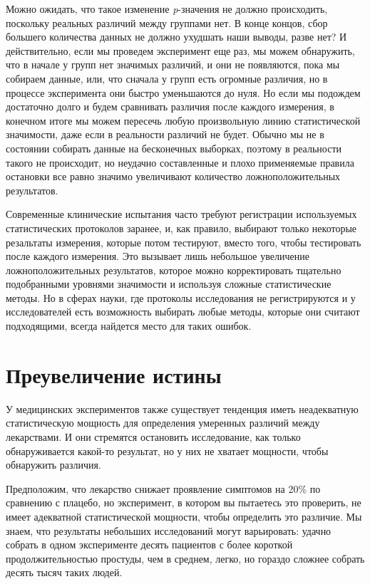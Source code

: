 Можно ожидать, что такое изменение \emph{p}-значения не должно происходить, поскольку реальных различий между группами нет. В конце концов, сбор большего количества данных не должно ухудшать наши выводы, разве нет? И действительно, если мы проведем эксперимент еще раз, мы можем обнаружить, что в начале у групп нет значимых различий, и они не появляются, пока мы собираем данные, или, что сначала у групп есть огромные различия, но в процессе эксперимента они быстро уменьшаются до нуля. Но если мы подождем достаточно долго и будем сравнивать различия после каждого измерения, в конечном итоге мы можем пересечь любую произвольную линию статистической значимости, даже если в реальности различий не будет. Обычно мы не в состоянии собирать данные на бесконечных выборках, поэтому в реальности такого не происходит, но неудачно  составленные и плохо применяемые правила остановки все равно значимо увеличивают количество ложноположительных результатов.\cite{simmons_false-positive_2011}  


Современные клинические испытания часто требуют регистрации используемых статистических протоколов заранее, и, как правило, выбирают только некоторые резальтаты измерения, которые потом тестируют, вместо того, чтобы тестировать после каждого измерения. Это вызывает лишь небольшое увеличение ложноположительных результатов, которое можно корректировать тщательно подобранными уровнями значимости и используя сложные статистические методы.\cite{todd_interim_2001} Но в сферах науки, где протоколы исследования не регистрируются и у исследователей есть возможность выбирать любые методы, которые они считают подходящими, всегда найдется место для таких ошибок.


\section{Преувеличение истины}
\label{chp7:truthinflation}

У медицинских экспериментов также существует тенденция иметь неадекватную статистическую мощность для определения умеренных различий между лекарствами. И они стремятся остановить исследование, как только обнаруживается какой-то результат, но у них не хватает мощности, чтобы обнаружить различия.

Предположим, что лекарство снижает проявление симптомов на 20\% по сравнению с плацебо, но эксперимент, в котором вы пытаетесь это проверить, не имеет адекватной статистической мощности, чтобы определить это различие. Мы знаем, что результаты небольших исследований могут варьировать: удачно собрать в одном эксперименте десять пациентов с более короткой продолжительностью простуды, чем в среднем, легко, но гораздо сложнее собрать десять тысяч таких людей.   

